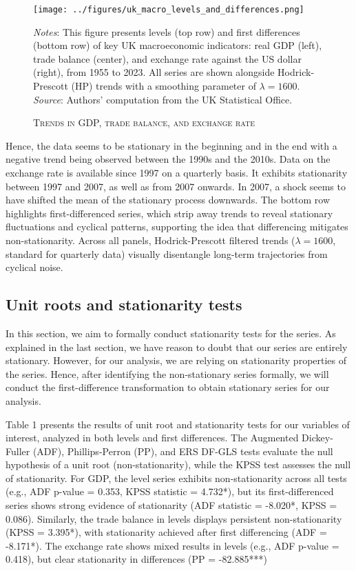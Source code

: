 \documentclass[
]{article}
\begin{document}
\begin{figure}[]

\caption{\large \textsc{Trends in GDP, trade balance, and exchange rate}}\label{fig:trends-plot}

{\centering \texttt{[image: ../figures/uk\_macro\_levels\_and\_differences.png]} 

}

{\footnotesize {\textit{Notes}: This figure presents levels (top row) and 
first differences (bottom row) of key UK macroeconomic indicators: real GDP 
(left), trade balance (center), and exchange rate against the US dollar (right),
from 1955 to 2023. All series are shown alongside Hodrick-Prescott (HP) trends 
with a smoothing parameter of $\lambda=1600$.  \\ \textit{Source}: Authors' 
computation from the UK Statistical Office.
} }

\end{figure}
Hence, the data seems to be
stationary in the beginning and in the end with a negative trend being
observed between the 1990s and the 2010s. Data on the exchange rate is available since
1997 on a quarterly basis. It exhibits stationarity between 1997 and
2007, as well as from 2007 onwards. In 2007, a shock seems to have
shifted the mean of the stationary process downwards. The bottom row highlights first-differenced series, which strip away trends to 
reveal stationary fluctuations and cyclical patterns, supporting the idea that 
differencing mitigates non-stationarity. Across all panels, Hodrick-Prescott 
filtered trends ($\lambda=1600$, standard for quarterly data) visually disentangle 
long-term trajectories from cyclical noise.

\subsection{Unit roots and stationarity tests}

In this section, we aim to formally conduct stationarity tests for the
series. As explained in the last section, we have reason to doubt that
our series are entirely stationary. However, for our analysis, we are
relying on stationarity properties of the series. Hence, after
identifying the non-stationary series formally, we will conduct the
first-difference transformation to obtain stationary series for our
analysis.

Table 1 presents the results of unit root and stationarity tests for our variables of interest, 
analyzed in both levels and first differences. The Augmented 
Dickey-Fuller (ADF), Phillips-Perron (PP), and ERS DF-GLS tests evaluate the 
null hypothesis of a unit root (non-stationarity), while the KPSS test assesses 
the null of stationarity. For GDP, the level series exhibits non-stationarity 
across all tests (e.g., ADF p-value = 0.353, KPSS statistic = 4.732*), but its 
first-differenced series shows strong evidence of stationarity (ADF statistic =
-8.020*, KPSS = 0.086). Similarly, the trade balance in levels displays 
persistent non-stationarity (KPSS = 3.395*), with stationarity achieved after 
first differencing (ADF = -8.171*). The exchange rate shows mixed results in 
levels (e.g., ADF p-value = 0.418), but clear stationarity in differences
(PP = -82.885***)
\end{document}
